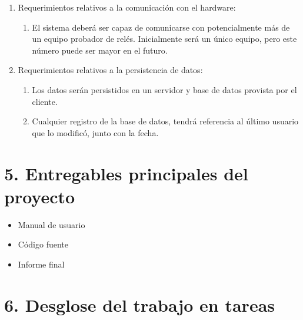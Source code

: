 \documentclass[11pt]{charter}
\begin{document}
\begin{enumerate}
\item Requerimientos relativos a la comunicación con el hardware:
	\begin{enumerate}
	\item El sistema deberá ser capaz de comunicarse con potencialmente más de un equipo probador de relés. Inicialmente será un único equipo, pero este número puede ser mayor en el futuro.
	\end{enumerate}

\item Requerimientos relativos a la persistencia de datos:
	\begin{enumerate}
	\item Los datos serán persistidos en un servidor y base de datos provista por el cliente.
	\item Cualquier registro de la base de datos, tendrá referencia al último usuario que lo modificó, junto con la fecha.
	\end{enumerate}

	
\end{enumerate}

\section{5. Entregables principales del proyecto}
\label{sec:entregables}

\begin{itemize}
\item Manual de usuario
\item Código fuente
\item Informe final
\end{itemize}

\section{6. Desglose del trabajo en tareas}
\label{sec:wbs}
\end{document}
